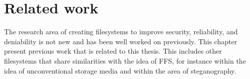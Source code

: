 \chapter{Related work}
\label{ch:related_work}
The research area of creating filesystems to improve security, reliability, and deniability is not new and has been well worked on previously. This chapter present previous work that is related to this thesis. This includes other filesystems that share similarities with the idea of FFS, for instance within the idea of unconventional storage media and within the area of steganography.





